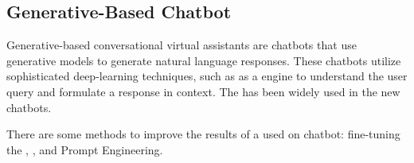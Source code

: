 




\subsection{Generative-Based Chatbot}

Generative-based conversational virtual assistants are chatbots that use generative models to generate natural language responses. These chatbots utilize sophisticated deep-learning techniques, such as {\llm} as a {\nlp} engine to understand the user query and formulate a response in context. The {\llm} has been widely used in the new chatbots.


There are some methods to improve the results of a {\llm} used on chatbot: fine-tuning the {\llm}, {\rag}, and Prompt Engineering.



